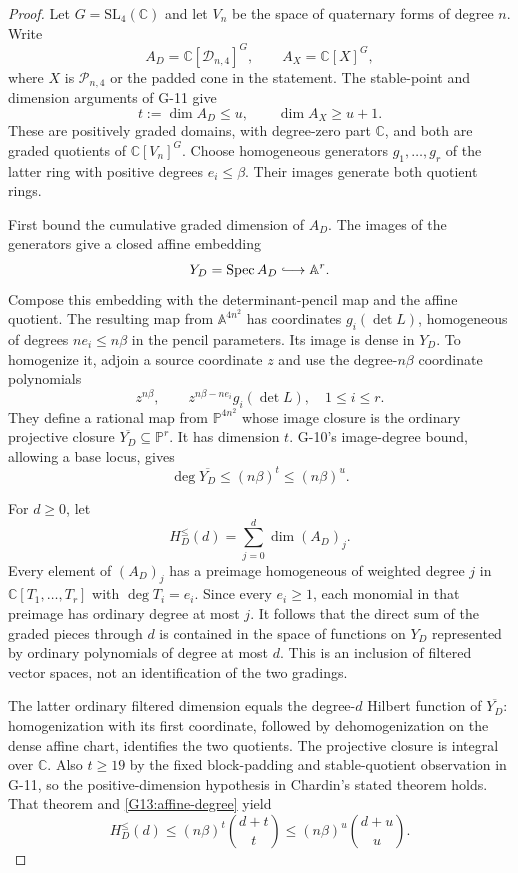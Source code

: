 \begin{proof}
Let $G=\mathrm{SL}_4(\mathbb C)$ and let $V_n$ be the space
of quaternary forms of degree $n$. Write
\[
 A_D=\mathbb C[\mathcal D_{n,4}]^G,
 \qquad A_X=\mathbb C[X]^G,
\]
where $X$ is $\mathcal P_{n,4}$ or the padded cone in the
statement. The stable-point and dimension arguments of G-11
give
\begin{equation}\label{G13:dims}
 t:=\dim A_D\leq u,\qquad \dim A_X\geq u+1.
\end{equation}
These are positively graded domains, with degree-zero part
$\mathbb C$, and both are graded quotients of
$\mathbb C[V_n]^G$. Choose homogeneous generators
$g_1,\ldots,g_r$ of the latter ring with positive degrees
$e_i\leq\beta$. Their images generate both quotient rings.

First bound the cumulative graded dimension of $A_D$. The
images of the generators give a closed affine embedding
\[
 Y_D=\operatorname{Spec} A_D\lhook\joinrel\longrightarrow
 \mathbb A^r.
\]
Compose this embedding with the determinant-pencil map and
the affine quotient. The resulting map from
$\mathbb A^{4n^2}$ has coordinates
$g_i(\det L)$, homogeneous of degrees $ne_i\leq n\beta$
in the pencil parameters. Its image is dense in $Y_D$.
To homogenize it, adjoin a source coordinate $z$ and use
the degree-$n\beta$ coordinate polynomials
\[
 z^{n\beta},\qquad
 z^{n\beta-ne_i}g_i(\det L),\quad 1\leq i\leq r.
\]
They define a rational map from $\mathbb P^{4n^2}$ whose
image closure is the ordinary projective closure
$\overline{Y_D}\subseteq\mathbb P^r$. It has dimension
$t$. G-10's image-degree bound, allowing a base locus, gives
\begin{equation}\label{G13:affine-degree}
 \deg\overline{Y_D}\leq(n\beta)^t\leq(n\beta)^u.
\end{equation}

For $d\geq0$, let
\[
 H_D^{\leq}(d)=\sum_{j=0}^d\dim(A_D)_j.
\]
Every element of $(A_D)_j$ has a preimage homogeneous of
weighted degree $j$ in $\mathbb C[T_1,\ldots,T_r]$ with
$\deg T_i=e_i$. Since every $e_i\geq1$, each monomial in
that preimage has ordinary degree at most $j$. It follows
that the direct sum of the graded pieces through $d$ is
contained in the space of functions on $Y_D$ represented
by ordinary polynomials of degree at most $d$.
This is an inclusion of filtered vector spaces, not an
identification of the two gradings.

The latter ordinary filtered dimension equals the
degree-$d$ Hilbert function of $\overline{Y_D}$:
homogenization with its first coordinate, followed by
dehomogenization on the dense affine chart, identifies the
two quotients. The projective closure is integral over
$\mathbb C$. Also $t\geq19$ by the fixed block-padding and
stable-quotient observation in G-11, so the positive-dimension
hypothesis in Chardin's stated theorem holds. That theorem
and \eqref{G13:affine-degree} yield
\begin{equation}\label{G13:upper}
 H_D^{\leq}(d)
 \leq(n\beta)^t\binom{d+t}{t}
 \leq(n\beta)^u\binom{d+u}{u}.
\end{equation}


\end{proof}

